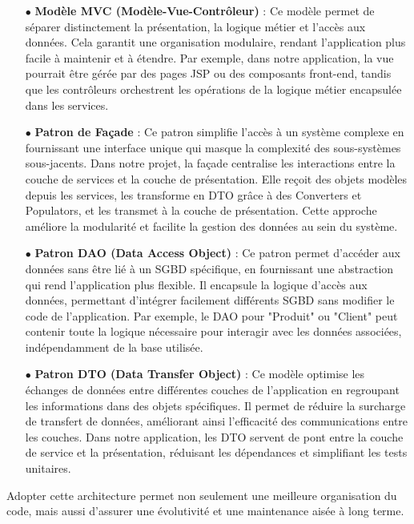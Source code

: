 \begin{itemize}
    \item[$\bullet$] \textbf{Modèle MVC (Modèle-Vue-Contrôleur)} : Ce modèle permet de séparer distinctement la présentation, la logique métier et l'accès aux données. Cela garantit une organisation modulaire, rendant l'application plus facile à maintenir et à étendre. Par exemple, dans notre application, la vue pourrait être gérée par des pages JSP ou des composants front-end, tandis que les contrôleurs orchestrent les opérations de la logique métier encapsulée dans les services.

    \item[$\bullet$] \textbf{Patron de Façade} : Ce patron simplifie l'accès à un système complexe en fournissant une interface unique qui masque la complexité des sous-systèmes sous-jacents. Dans notre projet, la façade centralise les interactions entre la couche de services et la couche de présentation. Elle reçoit des objets modèles depuis les services, les transforme en DTO grâce à des Converters et Populators, et les transmet à la couche de présentation. Cette approche améliore la modularité et facilite la gestion des données au sein du système.

    \item[$\bullet$] \textbf{Patron DAO (Data Access Object)} : Ce patron permet d'accéder aux données sans être lié à un SGBD spécifique, en fournissant une abstraction qui rend l'application plus flexible. Il encapsule la logique d'accès aux données, permettant d'intégrer facilement différents SGBD sans modifier le code de l'application. Par exemple, le DAO pour "Produit" ou "Client" peut contenir toute la logique nécessaire pour interagir avec les données associées, indépendamment de la base utilisée.

    \item[$\bullet$] \textbf{Patron DTO (Data Transfer Object)} : Ce modèle optimise les échanges de données entre différentes couches de l'application en regroupant les informations dans des objets spécifiques. Il permet de réduire la surcharge de transfert de données, améliorant ainsi l'efficacité des communications entre les couches. Dans notre application, les DTO servent de pont entre la couche de service et la présentation, réduisant les dépendances et simplifiant les tests unitaires.
\end{itemize}

Adopter cette architecture permet non seulement une meilleure organisation du code, mais aussi d'assurer une évolutivité et une maintenance aisée à long terme.
